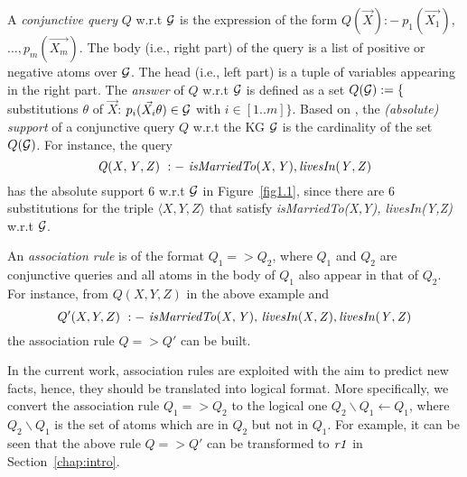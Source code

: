 A \emph{conjunctive query} $Q$ w.r.t $\mathcal{G}$ is the expression of the form $Q(\vec{X}):-\ p_1(\vec{X_1})$, $\dotsc,p_m(\vec{X_m})$. The body (i.e., right part) of the query is a list of positive or negative atoms over $\mathcal{G}$. The head (i.e., left part) is a tuple of variables appearing in the right part. The \emph{answer} of $Q$ w.r.t $\mathcal{G}$ is defined as a set $Q(\mathcal{G}):=\{$substitutions $\theta$ of $\vec{X}$: $p_i(\vec{X_i}\theta) \in \mathcal{G}$ with $i \in [1..m]\}$. Based on \cite{ref53}, the \emph{(absolute) support} of a conjunctive query $Q$ w.r.t the KG $\mathcal{G}$ is the cardinality of the set $Q(\mathcal{G})$. For instance, the query
\begin{equation}\mathit{Q(X,Y,Z)\ :-\ isMarriedTo(X,Y),\, }\mathit{livesIn(Y,Z)}
\end{equation}
has the absolute support $6$ w.r.t $\mathcal{G}$ in Figure~\ref{fig1.1}, since there are $6$ substitutions for the triple $\langle X, Y, Z \rangle$ that satisfy \textit{isMarriedTo(X,Y), livesIn(Y,Z)} w.r.t $\mathcal{G}$.

An \emph{association rule} is of the format $Q_1 => Q_2$, where $Q_1$ and $Q_2$ are conjunctive queries and all atoms in the body of $Q_1$ also appear in that of $Q_2$. For instance, from $Q(X,Y,Z)$ in the above example and
\begin{equation}Q'(X,Y,Z)\ :-\ \mi{isMarriedTo(X,Y),\,livesIn(X,Z),\,} \mi{livesIn(Y,Z)}
\end{equation} the association rule $Q => Q'$ can be built.

In the current work, association rules are exploited with the aim to predict new facts, hence, they should be translated into logical format. More specifically, we convert the association rule $Q_1=>Q_2$ to the logical one $Q_2\backslash Q_1 \leftarrow Q_1$, where $Q_2 \backslash Q_1$ is the set of atoms which are in $Q_2$ but not in $Q_1$. For example, it can be seen that the above rule $Q=>Q'$ can be transformed to $\mathit{r1}$ in Section~\ref{chap:intro}.

